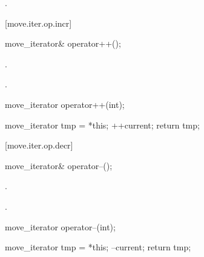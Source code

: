 \begin{itemdescr}
\pnum
\returns {}.
\end{itemdescr}

[move.iter.op.incr]{}

%
%
\begin{itemdecl}
move_iterator& operator++();
\end{itemdecl}

\begin{itemdescr}
\pnum
\effects {}.

\pnum
\returns {}.
\end{itemdescr}

%
%
\begin{itemdecl}
move_iterator operator++(int);
\end{itemdecl}

\begin{itemdescr}
\pnum
\effects
\begin{codeblock}
move_iterator tmp = *this;
++current;
return tmp;
\end{codeblock}
\end{itemdescr}

[move.iter.op.decr]{}

%
%
\begin{itemdecl}
move_iterator& operator--();
\end{itemdecl}

\begin{itemdescr}
\pnum
\effects {}.

\pnum
\returns {}.
\end{itemdescr}

%
%
\begin{itemdecl}
move_iterator operator--(int);
\end{itemdecl}

\begin{itemdescr}
\pnum
\effects
\begin{codeblock}
move_iterator tmp = *this;
--current;
return tmp;
\end{codeblock}
\end{itemdescr}

